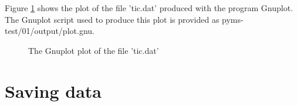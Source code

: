 \noindent
Figure \ref{fig:tic-plot} shows the plot of the file 'tic.dat' produced with
the
program Gnuplot. The Gnuplot script used to produce this plot is provided
as pyms-test/01/output/plot.gnu.

\begin{figure}[htp]
\begin{center}
\caption{The Gnuplot plot of the file 'tic.dat'}
\label{fig:tic-plot}
\end{center}
\end{figure}

%
%

\section{Saving data}


%
%
